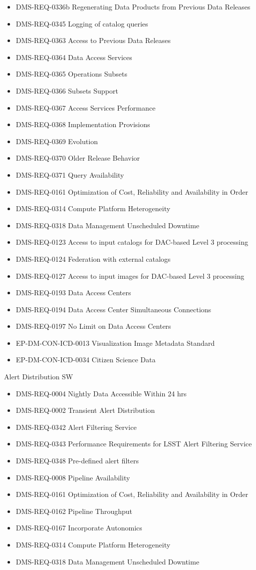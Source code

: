 \begin{itemize}
\item DMS-REQ-0336b Regenerating Data Products from Previous Data Releases
\item DMS-REQ-0345 Logging of catalog queries
\item DMS-REQ-0363 Access to Previous Data Releases
\item DMS-REQ-0364 Data Access Services
\item DMS-REQ-0365 Operations Subsets
\item DMS-REQ-0366 Subsets Support
\item DMS-REQ-0367 Access Services Performance
\item DMS-REQ-0368 Implementation Provisions
\item DMS-REQ-0369 Evolution
\item DMS-REQ-0370 Older Release Behavior
\item DMS-REQ-0371 Query Availability
\item DMS-REQ-0161 Optimization of Cost, Reliability and Availability in Order
\item DMS-REQ-0314 Compute Platform Heterogeneity
\item DMS-REQ-0318 Data Management Unscheduled Downtime
\item DMS-REQ-0123 Access to input catalogs for DAC-based Level 3 processing
\item DMS-REQ-0124 Federation with external catalogs
\item DMS-REQ-0127 Access to input images for DAC-based Level 3 processing
\item DMS-REQ-0193 Data Access Centers
\item DMS-REQ-0194 Data Access Center Simultaneous Connections
\item DMS-REQ-0197 No Limit on Data Access Centers
\item EP-DM-CON-ICD-0013 Visualization Image Metadata Standard
\item EP-DM-CON-ICD-0034 Citizen Science Data
\end{itemize}
Alert Distribution SW \begin{itemize}
\item DMS-REQ-0004 Nightly Data Accessible Within 24 hrs
\item DMS-REQ-0002 Transient Alert Distribution
\item DMS-REQ-0342 Alert Filtering Service
\item DMS-REQ-0343 Performance Requirements for LSST Alert Filtering Service
\item DMS-REQ-0348 Pre-defined alert filters
\item DMS-REQ-0008 Pipeline Availability
\item DMS-REQ-0161 Optimization of Cost, Reliability and Availability in Order
\item DMS-REQ-0162 Pipeline Throughput
\item DMS-REQ-0167 Incorporate Autonomics
\item DMS-REQ-0314 Compute Platform Heterogeneity
\item DMS-REQ-0318 Data Management Unscheduled Downtime
\end{itemize}
